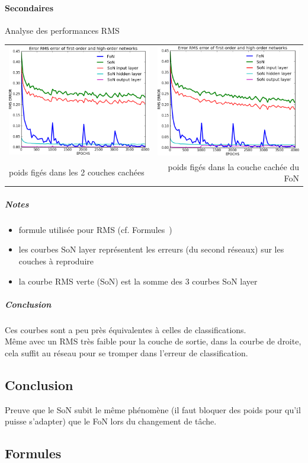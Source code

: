     \paragraph{Secondaires}
       Analyse des performances RMS
      \begin{center}
	\begin{tabular}{lr}
	  \hspace*{-1cm}
	  \includegraphics[width=250px]{data/expB4/rms_bb.png}
	  &
	  \includegraphics[width=250px]{data/expB4/rms_block.png} \\
	  poids figés dans les 2 couches cachées
	  &
	  poids figés dans la couche cachée du FoN
	\end{tabular}
      \end{center} 
      \subparagraph{Notes}
	\begin{itemize}
	  \item formule utilisée pour RMS (cf. Formules~)
	  \item les courbes SoN layer représentent les erreurs (du second réseaux) sur les couches à reproduire 
	  \item la courbe RMS verte (SoN) est la somme des 3 courbes SoN layer
	\end{itemize}
      \subparagraph{Conclusion}
	Ces courbes sont a peu près équivalentes à celles de classifications.
	\\
	Même avec un RMS très faible pour la couche de sortie, dans la courbe de droite,
	cela suffit au réseau pour se tromper dans l'erreur de classification.

  \subsection{Conclusion}
  Preuve que le SoN subit le même phénomène (il faut bloquer des poids pour qu'il puisse s'adapter) que le FoN lors du changement de tâche.
  

  \newpage 
  \subsection{Formules}
    
    



